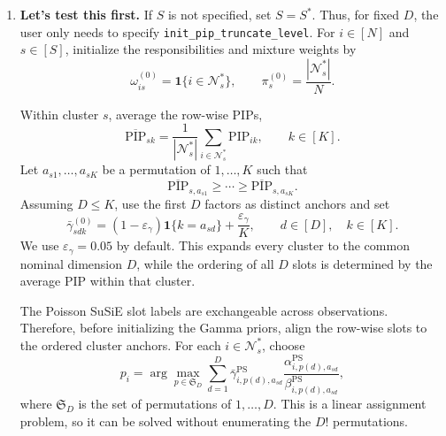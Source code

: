\documentclass[11pt]{article}
\newcommand{\one}{\mathbf{1}}
\theoremstyle{plain}
\theoremstyle{definition}
\begin{document}
\begin{enumerate}
\item \textbf{Let's test this first.} If $S$ is not specified, set
$S=S^*$. Thus, for fixed $D$, the user only needs to specify
\texttt{init\_pip\_truncate\_level}. For $i\in[N]$ and $s\in[S]$,
initialize the responsibilities and mixture weights by
\begin{equation}
  \omega_{is}^{(0)}
  =\one\{i\in\mathcal N_s^*\},
  \qquad
  \pi_s^{(0)}=\frac{|\mathcal N_s^*|}{N}.
  \label{eq:pip-auto-omega-init}
\end{equation}

Within cluster $s$, average the row-wise PIPs,
\begin{equation}
  \overline{\mathrm{PIP}}_{sk}
  =
  \frac{1}{|\mathcal N_s^*|}
  \sum_{i\in\mathcal N_s^*}\mathrm{PIP}_{ik},
  \qquad k\in[K].
  \label{eq:cluster-average-pip}
\end{equation}
Let $a_{s1},\ldots,a_{sK}$ be a permutation of $1,\ldots,K$ such that
\[
  \overline{\mathrm{PIP}}_{s,a_{s1}}
  \geq \cdots \geq
  \overline{\mathrm{PIP}}_{s,a_{sK}}.
\]
Assuming $D\leq K$, use the first $D$ factors as distinct anchors and set
\begin{equation}
  \bar\gamma_{sdk}^{(0)}
  =
  (1-\varepsilon_\gamma)\one\{k=a_{sd}\}
  +\frac{\varepsilon_\gamma}{K},
  \qquad d\in[D],\quad k\in[K].
  \label{eq:pip-anchor-gamma-init}
\end{equation}
We use $\varepsilon_\gamma=0.05$ by default. This expands every cluster to
the common nominal dimension $D$, while the ordering of all $D$ slots is
determined by the average PIP within that cluster.

The Poisson SuSiE slot labels are exchangeable across observations. Therefore,
before initializing the Gamma priors, align the row-wise slots to the ordered
cluster anchors. For each $i\in\mathcal N_s^*$, choose
\begin{equation}
  p_i
  =
  \arg\max_{p\in\mathfrak S_D}
  \sum_{d=1}^D
  \bar\gamma^{\mathrm{PS}}_{i,p(d),a_{sd}}
  \frac{\alpha^{\mathrm{PS}}_{i,p(d),a_{sd}}}
       {\beta^{\mathrm{PS}}_{i,p(d),a_{sd}}},
  \label{eq:pip-anchor-slot-alignment}
\end{equation}
where $\mathfrak S_D$ is the set of permutations of $1,\ldots,D$. This is a
linear assignment problem, so it can be solved without enumerating the $D!$
permutations.


\end{enumerate}
\end{document}
